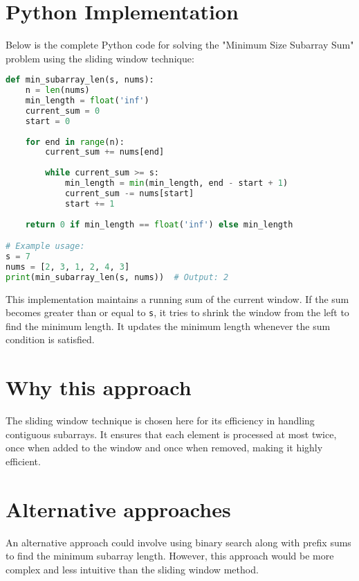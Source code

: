 \section*{Python Implementation}

Below is the complete Python code for solving the "Minimum Size Subarray Sum" problem using the sliding window technique:

\begin{fullwidth}
\begin{lstlisting}[language=Python]
def min_subarray_len(s, nums):
    n = len(nums)
    min_length = float('inf')
    current_sum = 0
    start = 0
    
    for end in range(n):
        current_sum += nums[end]
        
        while current_sum >= s:
            min_length = min(min_length, end - start + 1)
            current_sum -= nums[start]
            start += 1
    
    return 0 if min_length == float('inf') else min_length

# Example usage:
s = 7
nums = [2, 3, 1, 2, 4, 3]
print(min_subarray_len(s, nums))  # Output: 2
\end{lstlisting}

\end{fullwidth}

This implementation maintains a running sum of the current window. If the sum becomes greater than or equal to \texttt{s}, it tries to shrink the window from the left to find the minimum length. It updates the minimum length whenever the sum condition is satisfied.

\section*{Why this approach}

The sliding window technique is chosen here for its efficiency in handling contiguous subarrays. It ensures that each element is processed at most twice, once when added to the window and once when removed, making it highly efficient.

\section*{Alternative approaches}

An alternative approach could involve using binary search along with prefix sums to find the minimum subarray length. However, this approach would be more complex and less intuitive than the sliding window method.

